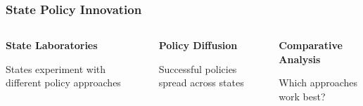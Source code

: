 \documentclass[10pt]{beamer}
\begin{document}
\begin{frame}
\frametitle{State Policy Innovation}

\begin{columns}
\begin{column}{0.32\textwidth}
\begin{center}

\textbf{State Laboratories}

States experiment with different policy approaches
\end{center}
\end{column}

\begin{column}{0.32\textwidth}
\begin{center}

\textbf{Policy Diffusion}

Successful policies spread across states
\end{center}
\end{column}

\begin{column}{0.32\textwidth}
\begin{center}

\textbf{Comparative Analysis}

Which approaches work best?
\end{center}
\end{column}
\end{columns}

\end{frame}
\end{document}
